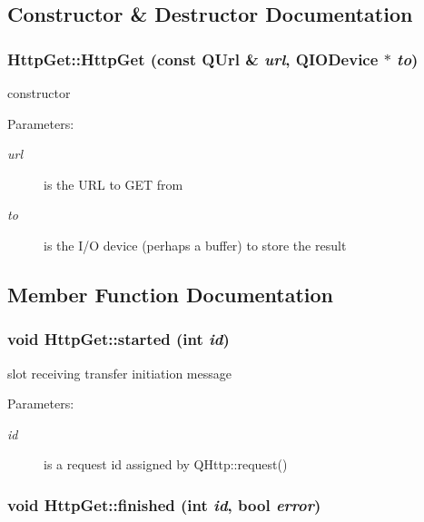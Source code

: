 \subsection{Constructor \& Destructor Documentation}
\hypertarget{classHttpGet_76edd93335851c30cb2e2970ac2b1ee3}{
\subsubsection[HttpGet]{\setlength{\rightskip}{0pt plus 5cm}HttpGet::HttpGet (const QUrl \& {\em url}, \/  QIODevice $\ast$ {\em to})}}
\label{classHttpGet_76edd93335851c30cb2e2970ac2b1ee3}


constructor \begin{Desc}
\item[Parameters:]
\begin{description}
\item[{\em url}]is the URL to GET from \item[{\em to}]is the I/O device (perhaps a buffer) to store the result \end{description}
\end{Desc}


\subsection{Member Function Documentation}
\hypertarget{classHttpGet_35c20afd19d381fb0a3b56a2a872d3dc}{
\subsubsection[started]{\setlength{\rightskip}{0pt plus 5cm}void HttpGet::started (int {\em id})}}
\label{classHttpGet_35c20afd19d381fb0a3b56a2a872d3dc}


slot receiving transfer initiation message \begin{Desc}
\item[Parameters:]
\begin{description}
\item[{\em id}]is a request id assigned by QHttp::request() \end{description}
\end{Desc}
\hypertarget{classHttpGet_0159973f3e836f436ebf02984eb622f7}{
\subsubsection[finished]{\setlength{\rightskip}{0pt plus 5cm}void HttpGet::finished (int {\em id}, \/  bool {\em error})}}
\label{classHttpGet_0159973f3e836f436ebf02984eb622f7}


